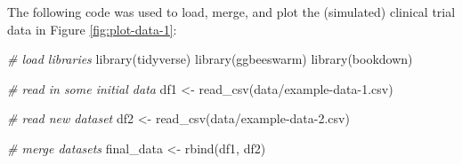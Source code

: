\documentclass[smallextended]{svjour3}       %
\newenvironment{Shaded}{\begin{snugshade}}{\end{snugshade}}
\newcommand{\CommentTok}[1]{\textcolor[rgb]{0.56,0.35,0.01}{\textit{#1}}}
\newcommand{\FunctionTok}[1]{\textcolor[rgb]{0.00,0.00,0.00}{#1}}
\newcommand{\NormalTok}[1]{#1}
\newcommand{\OtherTok}[1]{\textcolor[rgb]{0.56,0.35,0.01}{#1}}
\newcommand{\StringTok}[1]{\textcolor[rgb]{0.31,0.60,0.02}{#1}}
\begin{document}
The following code was used to load, merge, and plot the (simulated) clinical trial data in Figure \ref{fig:plot-data-1}:

\begin{Shaded}
\begin{Highlighting}[]
\CommentTok{\# load libraries}
\FunctionTok{library}\NormalTok{(tidyverse)}
\FunctionTok{library}\NormalTok{(ggbeeswarm)}
\FunctionTok{library}\NormalTok{(bookdown)}
\end{Highlighting}
\end{Shaded}

\begin{Shaded}
\begin{Highlighting}[]
\CommentTok{\# read in some initial data}
\NormalTok{df1 }\OtherTok{\textless{}{-}} \FunctionTok{read\_csv}\NormalTok{(}\StringTok{\textquotesingle{}data/example{-}data{-}1.csv\textquotesingle{}}\NormalTok{)}
\end{Highlighting}
\end{Shaded}

\begin{Shaded}
\begin{Highlighting}[]
\CommentTok{\# read new dataset}
\NormalTok{df2 }\OtherTok{\textless{}{-}} \FunctionTok{read\_csv}\NormalTok{(}\StringTok{\textquotesingle{}data/example{-}data{-}2.csv\textquotesingle{}}\NormalTok{)}
\end{Highlighting}
\end{Shaded}

\begin{Shaded}
\begin{Highlighting}[]
\CommentTok{\# merge datasets}
\NormalTok{final\_data }\OtherTok{\textless{}{-}} \FunctionTok{rbind}\NormalTok{(df1, df2)}
\end{Highlighting}
\end{Shaded}
\end{document}
